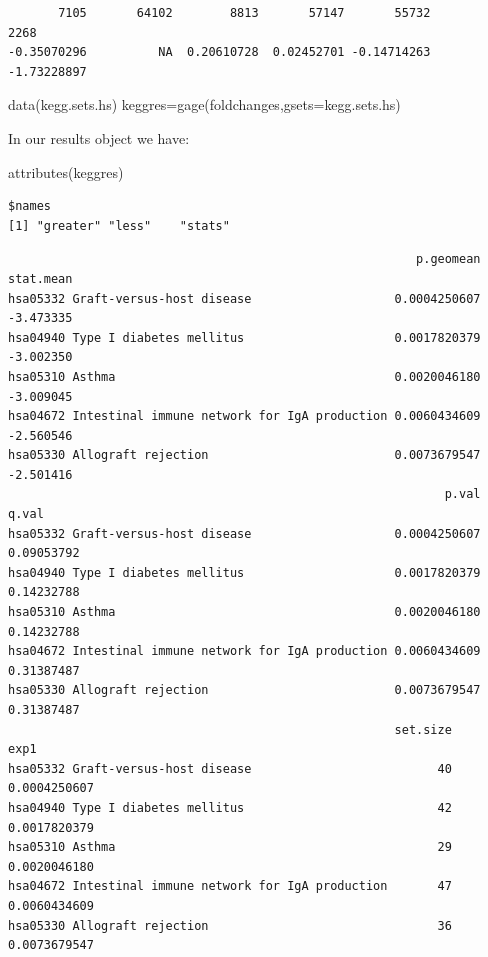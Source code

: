 \documentclass[
  letterpaper,
  DIV=11,
  numbers=noendperiod]{scrartcl}
\newenvironment{Shaded}{\begin{snugshade}}{\end{snugshade}}
\newcommand{\AttributeTok}[1]{\textcolor[rgb]{0.40,0.45,0.13}{#1}}
\newcommand{\DecValTok}[1]{\textcolor[rgb]{0.68,0.00,0.00}{#1}}
\newcommand{\FunctionTok}[1]{\textcolor[rgb]{0.28,0.35,0.67}{#1}}
\newcommand{\NormalTok}[1]{\textcolor[rgb]{0.00,0.23,0.31}{#1}}
\newcommand{\OtherTok}[1]{\textcolor[rgb]{0.00,0.23,0.31}{#1}}
\newcommand{\SpecialCharTok}[1]{\textcolor[rgb]{0.37,0.37,0.37}{#1}}
\begin{document}
\begin{verbatim}
       7105       64102        8813       57147       55732        2268 
-0.35070296          NA  0.20610728  0.02452701 -0.14714263 -1.73228897 
\end{verbatim}

\begin{Shaded}
\begin{Highlighting}[]
\FunctionTok{data}\NormalTok{(kegg.sets.hs)}
\NormalTok{keggres}\OtherTok{=}\FunctionTok{gage}\NormalTok{(foldchanges,}\AttributeTok{gsets=}\NormalTok{kegg.sets.hs)}
\end{Highlighting}
\end{Shaded}

In our results object we have:

\begin{Shaded}
\begin{Highlighting}[]
\FunctionTok{attributes}\NormalTok{(keggres)}
\end{Highlighting}
\end{Shaded}

\begin{verbatim}
$names
[1] "greater" "less"    "stats"  
\end{verbatim}

\begin{Shaded}
\end{Shaded}

\begin{verbatim}
                                                         p.geomean stat.mean
hsa05332 Graft-versus-host disease                    0.0004250607 -3.473335
hsa04940 Type I diabetes mellitus                     0.0017820379 -3.002350
hsa05310 Asthma                                       0.0020046180 -3.009045
hsa04672 Intestinal immune network for IgA production 0.0060434609 -2.560546
hsa05330 Allograft rejection                          0.0073679547 -2.501416
                                                             p.val      q.val
hsa05332 Graft-versus-host disease                    0.0004250607 0.09053792
hsa04940 Type I diabetes mellitus                     0.0017820379 0.14232788
hsa05310 Asthma                                       0.0020046180 0.14232788
hsa04672 Intestinal immune network for IgA production 0.0060434609 0.31387487
hsa05330 Allograft rejection                          0.0073679547 0.31387487
                                                      set.size         exp1
hsa05332 Graft-versus-host disease                          40 0.0004250607
hsa04940 Type I diabetes mellitus                           42 0.0017820379
hsa05310 Asthma                                             29 0.0020046180
hsa04672 Intestinal immune network for IgA production       47 0.0060434609
hsa05330 Allograft rejection                                36 0.0073679547
\end{verbatim}
\end{document}
